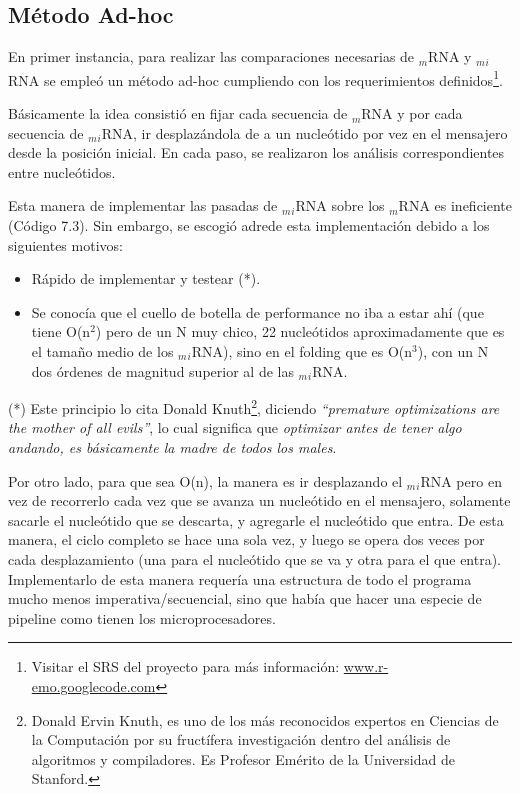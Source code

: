 \subsection{Método Ad-hoc}
\label{adhoc}
\par En primer instancia, para realizar las comparaciones necesarias de $_m$RNA y $_m$$_i$RNA se empleó un método ad-hoc cumpliendo con los requerimientos definidos\footnote{Visitar el SRS del proyecto para más información: \url{www.r-emo.googlecode.com}}. 
\par Básicamente la idea consistió en fijar cada secuencia de $_m$RNA y por cada secuencia de $_m$$_i$RNA, ir desplazándola de a un nucleótido por vez en el mensajero desde la posición inicial. En cada paso, se realizaron los análisis correspondientes entre nucleótidos.
\par Esta manera de implementar las pasadas de $_m$$_i$RNA sobre los $_m$RNA es ineficiente (Código 7.3). Sin embargo, se escogió adrede esta implementación debido a los siguientes motivos:
\begin{itemize}
	\item Rápido de implementar y testear (*).
	\item Se conocía que el cuello de botella de performance no iba a estar ahí (que tiene O(n$^2$) pero de un N muy chico, 22 nucleótidos aproximadamente que es el tamaño medio de los $_m$$_i$RNA), sino en el folding que es O(n$^3$), con un N dos órdenes de magnitud superior al de las $_m$$_i$RNA.
\end{itemize}

\par (*) Este principio lo cita Donald Knuth\footnote{Donald Ervin Knuth, es uno de los más reconocidos expertos en Ciencias de la Computación por su fructífera investigación dentro del análisis de algoritmos y compiladores. Es Profesor Emérito de la Universidad de Stanford.}, diciendo \emph{``premature optimizations are the mother of all evils''}, lo cual significa que \emph{optimizar antes de tener algo andando, es básicamente la madre de todos los males}.

\par Por otro lado, para que sea O(n), la manera es ir desplazando el $_m$$_i$RNA pero en vez de recorrerlo cada vez que se avanza un nucleótido en el mensajero, solamente sacarle el nucleótido que se descarta, y agregarle el nucleótido que entra. De esta manera, el ciclo completo se hace una sola vez, y luego se opera dos veces por cada desplazamiento (una para el nucleótido que se va y otra para el que entra). Implementarlo de esta manera requería una estructura de todo el programa mucho menos imperativa/secuencial, sino que había que hacer una especie de pipeline como tienen los microprocesadores.

